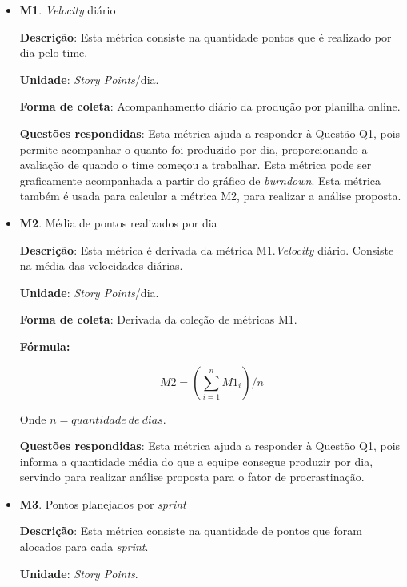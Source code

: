 	\begin{itemize}
	 
	 \item \textbf{M1}. \textit{Velocity} diário
	 
	   \subitem \textbf{Descrição}: Esta métrica consiste na quantidade pontos que é realizado por dia pelo time.
	   
	   \subitem \textbf{Unidade}: \textit{Story Points}/dia.
	   
	   \subitem \textbf{Forma de coleta}: Acompanhamento diário da produção por planilha online.
	   
	   \subitem \textbf{Questões respondidas}: Esta métrica ajuda a responder à Questão Q1, pois permite acompanhar o quanto
		    foi produzido por dia, proporcionando a avaliação de quando o time começou a trabalhar. Esta métrica pode ser 
		    graficamente acompanhada a partir do gráfico de \textit{burndown}. Esta métrica também é usada para calcular a
		    métrica M2, para realizar a análise proposta.
	 
	 \item \textbf{M2}. Média de pontos realizados por dia
	   
	   \subitem \textbf{Descrição}: Esta métrica é derivada da métrica M1.\textit{Velocity} diário. Consiste na média das velocidades
		    diárias.
	   
	   \subitem \textbf{Unidade}: \textit{Story Points}/dia.
	   
	   \subitem \textbf{Forma de coleta}: Derivada da coleção de métricas M1.
	   
	      \subsubitem \textbf{Fórmula:} 
	      
		$$ M2 = (\sum\limits_{i=1}^{n}M1_i)/n $$
		
	      \subsubitem Onde $n = quantidade\ de\ dias$.
	   
	   \subitem \textbf{Questões respondidas}: Esta métrica ajuda a responder à Questão Q1, pois informa a quantidade média do 
		    que a equipe consegue produzir por dia, servindo para realizar análise proposta para o fator de procrastinação.
	  
	 \item \textbf{M3}. Pontos planejados por \textit{sprint}
	  
	   \subitem \textbf{Descrição}: Esta métrica consiste na quantidade de pontos que foram alocados para cada \textit{sprint}.
	   
	   \subitem \textbf{Unidade}: \textit{Story Points}.
	   

\end{itemize}
